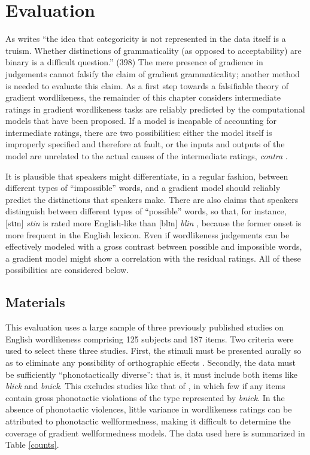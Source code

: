 
\section{Evaluation}
\label{2evaluation}

As \citet{Newmeyer2007} writes ``the idea that categoricity is not represented in the data itself is a truism. Whether distinctions of grammaticality (as opposed to acceptability) are binary is a difficult question.'' (398)
The mere presence of gradience in judgements cannot falsify the claim of gradient grammaticality; another method is needed to evaluate this claim.
As a first step towards a falsifiable theory of gradient wordlikeness, the remainder of this chapter considers intermediate ratings in gradient wordlikeness tasks are reliably predicted by the computational models that have been proposed.
If a model is incapable of accounting for intermediate ratings, there are two possibilities: either the model itself is improperly specified and therefore at fault, or the inputs and outputs of the model are unrelated to the actual causes of the intermediate ratings, \emph{contra} \citet{Hayes2000}.

It is plausible that speakers might differentiate, in a regular fashion, between different types of ``impossible'' words, and a gradient model should reliably predict the distinctions that speakers make.
There are also claims that speakers distinguish between different types of ``possible'' words, so that, for instance, [stɪn] \emph{stin} is rated more English-like than [blɪn] \emph{blin} \citep[e.g.,][]{Albright2009a}, because the former onset is more frequent in the English lexicon.
Even if wordlikeness judgements can be effectively modeled with a gross contrast between possible and impossible words, a gradient model might show a correlation with the residual ratings.
All of these possibilities are considered below.

\subsection{Materials}

This evaluation uses a large sample of three previously published studies on English wordlikeness comprising 125 subjects and 187 items.
Two criteria were used to select these three studies.
First, the stimuli must be presented aurally so as to eliminate any possibility of orthographic effects \citep[e.g.,][]{Berent2001b,Berent2008b}. 
Secondly, the data must be sufficiently ``phonotactically diverse'': that is, it must include both items like \emph{blick} and \emph{bnick}. 
This excludes studies like that of \citet{Bailey2001}, in which few if any items contain gross phonotactic violations of the type represented by \emph{bnick}.
In the absence of phonotactic violences, little variance in wordlikeness ratings can be attributed to phonotactic wellformedness, making it difficult to determine the coverage of gradient wellformedness models.
The data used here is summarized in Table \ref{counts}.

